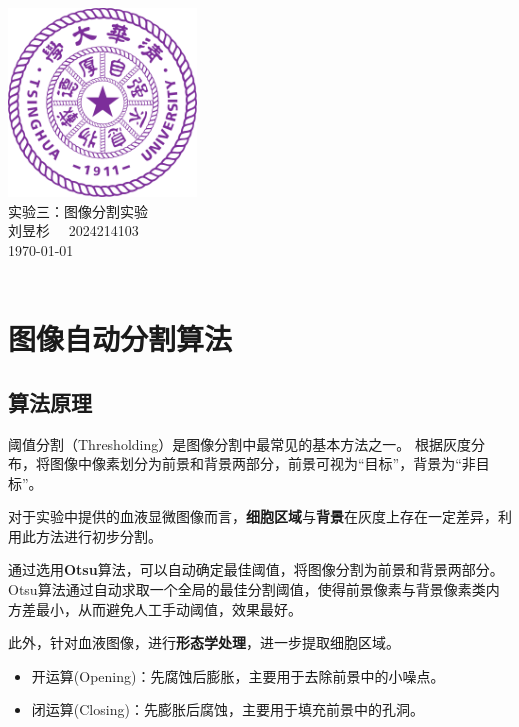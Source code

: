 \documentclass[12pt]{ctexart}
\begin{document}
\begin{titlepage}
    \begin{center}
        \includegraphics[width=5cm]{tsinghua_logo.png}\\[4cm]  %
        {\Huge 实验三：图像分割实验} \\[4cm]
        {\large 刘昱杉  \ \  2024214103}\\[6cm]
        {\normalsize \today}\\[1cm]
        \vfill
        \\

    \end{center}
\end{titlepage}

\section*{图像自动分割算法}

\subsection*{算法原理}

阈值分割（Thresholding）是图像分割中最常见的基本方法之一。
根据灰度分布，将图像中像素划分为前景和背景两部分，前景可视为“目标”，背景为“非目标”。

对于实验中提供的血液显微图像而言，\textbf{细胞区域}与\textbf{背景}在灰度上存在一定差异，利用此方法进行初步分割。

通过选用\textbf{Otsu}算法，可以自动确定最佳阈值，将图像分割为前景和背景两部分。
Otsu算法通过自动求取一个全局的最佳分割阈值，使得前景像素与背景像素类内方差最小，从而避免人工手动阈值，效果最好。

此外，针对血液图像，进行\textbf{形态学处理}，进一步提取细胞区域。
\begin{itemize}
    \item 开运算(Opening)：先腐蚀后膨胀，主要用于去除前景中的小噪点。
    \item 闭运算(Closing)：先膨胀后腐蚀，主要用于填充前景中的孔洞。
\end{itemize}
\end{document}
